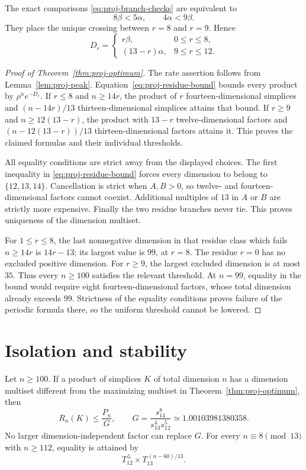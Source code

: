 The exact comparisons \eqref{eq:proj-branch-checks} are equivalent to
\[
 8\beta<5\alpha,\qquad 4\alpha<9\beta.
\]
They place the unique crossing between $r=8$ and $r=9$. Hence
\begin{equation}\label{eq:proj-Dr}
 D_r=\begin{cases}
 r\beta,&0\le r\le8,\\
 (13-r)\alpha,&9\le r\le12.
 \end{cases}
\end{equation}

\begin{proof}[Proof of Theorem~\ref{thm:proj-optimum}]
The rate assertion follows from Lemma~\ref{lem:proj-peak}.
Equation~\eqref{eq:proj-residue-bound} bounds every product by
$\rho^n e^{-D_r}$. If $r\le8$ and $n\ge14r$, the product of $r$
fourteen-dimensional simplices and $(n-14r)/13$ thirteen-dimensional
simplices attains that bound. If $r\ge9$ and
$n\ge12(13-r)$, the product with $13-r$ twelve-dimensional factors
and $(n-12(13-r))/13$ thirteen-dimensional factors attains it.
This proves the claimed formulas and their individual thresholds.

All equality conditions are strict away from the displayed choices.
The first inequality in \eqref{eq:proj-residue-bound} forces every
dimension to belong to $\{12,13,14\}$. Cancellation is strict when
$A,B>0$, so twelve- and fourteen-dimensional factors cannot coexist.
Additional multiples of $13$ in $A$ or $B$ are strictly more expensive.
Finally the two residue branches never tie. This proves uniqueness of
the dimension multiset.

For $1\le r\le8$, the last nonnegative dimension in that residue class
which fails $n\ge14r$ is $14r-13$; its largest value is $99$, at
$r=8$. The residue $r=0$ has no excluded positive dimension. For
$r\ge9$, the largest excluded dimension is at most $35$.
Thus every $n\ge100$ satisfies the relevant threshold. At $n=99$,
equality in the bound would require eight fourteen-dimensional
factors, whose total dimension already exceeds $99$. Strictness of
the equality conditions proves failure of the periodic formula there,
so the uniform threshold cannot be lowered.
\end{proof}

\section{Isolation and stability}

\begin{theorem}
\label{thm:proj-gap}
Let $n\ge100$. If a product of simplices $K$ of total dimension $n$
has a dimension multiset different from the maximizing multiset in
Theorem~\ref{thm:proj-optimum}, then
\[
 R_n(K)\le\frac{P_n}{G},\qquad
 G=\frac{s_{14}^{8}}{s_{13}^{4}s_{12}^{5}}
      \simeq1.00103981380358.
\]
No larger dimension-independent factor can replace $G$. For every
$n\equiv8\pmod {13}$ with $n\ge112$, equality is attained by
\[
 T_{12}^{\,5}\times T_{13}^{\,(n-60)/13}.
\]
\end{theorem}

